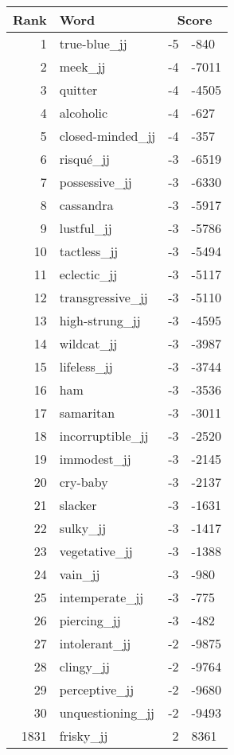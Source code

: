 \begin{longtable}[!htbp]{| rlr@{.}l |}
    \hline
    \textbf{Rank} & \textbf{Word} & \multicolumn{2}{c|}{\textbf{Score}} \\
    \hline
    \endhead
    1 & true-blue\_jj & -5 & -840 \\
    2 & meek\_jj & -4 & -7011 \\
    3 & quitter & -4 & -4505 \\
    4 & alcoholic & -4 & -627 \\
    5 & closed-minded\_jj & -4 & -357 \\
    6 & risqué\_jj & -3 & -6519 \\
    7 & possessive\_jj & -3 & -6330 \\
    8 & cassandra & -3 & -5917 \\
    9 & lustful\_jj & -3 & -5786 \\
    10 & tactless\_jj & -3 & -5494 \\
    11 & eclectic\_jj & -3 & -5117 \\
    12 & transgressive\_jj & -3 & -5110 \\
    13 & high-strung\_jj & -3 & -4595 \\
    14 & wildcat\_jj & -3 & -3987 \\
    15 & lifeless\_jj & -3 & -3744 \\
    16 & ham & -3 & -3536 \\
    17 & samaritan & -3 & -3011 \\
    18 & incorruptible\_jj & -3 & -2520 \\
    19 & immodest\_jj & -3 & -2145 \\
    20 & cry-baby & -3 & -2137 \\
    21 & slacker & -3 & -1631 \\
    22 & sulky\_jj & -3 & -1417 \\
    23 & vegetative\_jj & -3 & -1388 \\
    24 & vain\_jj & -3 & -980 \\
    25 & intemperate\_jj & -3 & -775 \\
    26 & piercing\_jj & -3 & -482 \\
    27 & intolerant\_jj & -2 & -9875 \\
    28 & clingy\_jj & -2 & -9764 \\
    29 & perceptive\_jj & -2 & -9680 \\
    30 & unquestioning\_jj & -2 & -9493 \\
    1831 & frisky\_jj & 2 & 8361 \\

\end{longtable}
